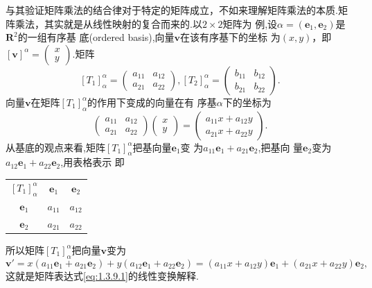 ﻿\documentclass{book} \usepackage{exsheets} \usepackage{xeCJK}
\begin{document}
\begin{solution}
  与其验证矩阵乘法的结合律对于特定的矩阵成立，不如来理解矩阵乘法的本质.矩
  阵乘法，其实就是从线性映射的复合而来的.以$2\times 2$矩阵为
  例,设$\alpha=(\mathbf{e}_1,\mathbf{e}_2)$是$\mathbf{R}^2$的一组有序基
  底(ordered
  basis),向量$\mathbf{v}$在该有序基下的坐标
  为$(x,y)$，即$[\mathbf{v}]^{\alpha}=
  \begin{pmatrix}
    x\\
    y
  \end{pmatrix}
  $.矩阵
$$
[T_{1}]_{\alpha}^{\alpha}=
\begin{pmatrix}
  a_{11}&a_{12}\\
  a_{21}&a_{22}
\end{pmatrix},[T_{2}]_{\alpha}^{\alpha}=
\begin{pmatrix}
  b_{11}&b_{12}\\
  b_{21}&b_{22}
\end{pmatrix}.
$$
向量$\mathbf{v}$在矩阵$[T_{1}]_{\alpha}^{\alpha}$的作用下变成的向量在有
序基$\alpha$下的坐标为
\begin{equation}\label{eq:1.3.9.1}\tag{1}
  \begin{pmatrix}
    a_{11}&a_{12}\\
    a_{21}&a_{22}
  \end{pmatrix}
  \begin{pmatrix}
    x\\
    y
  \end{pmatrix}=
  \begin{pmatrix}
    a_{11}x+a_{12}y\\
    a_{21}x+a_{22}y
  \end{pmatrix}.
\end{equation}
从基底的观点来看,矩阵$[T_1]_{\alpha}^{\alpha}$把基向量$\mathbf{e}_1$变
为$a_{11}\mathbf{e}_1+a_{21}\mathbf{e}_2$,把基向
量$\mathbf{e}_2$变为$a_{12}\mathbf{e}_1+a_{22}\mathbf{e}_2$,用表格表示
即
\begin{center}
  \begin{tabular}{|c|c|c|}
    $[T_1]_{\alpha}^{\alpha}$ & $\mathbf{e}_1$& $\mathbf{e}_{2}$\\
    $\mathbf{e}_1$ & $a_{11}$ & $a_{12}$ \\
    $\mathbf{e}_2$ & $a_{21}$ & $a_{22}$ \\
  \end{tabular}
\end{center}
所以矩阵$[T_1]_{\alpha}^{\alpha}$把向量$\mathbf{v}$变为
$$
\mathbf{v}'=x(a_{11}\mathbf{e}_1+a_{21}\mathbf{e}_2)+y(a_{12}\mathbf{e}_1+a_{22}\mathbf{e}_2)=(a_{11}x+a_{12}y)\mathbf{e}_1+(a_{21}x+a_{22}y)\mathbf{e}_2,
$$
这就是矩阵表达式\eqref{eq:1.3.9.1}的线性变换解释.\\


\end{solution}
\end{document}
